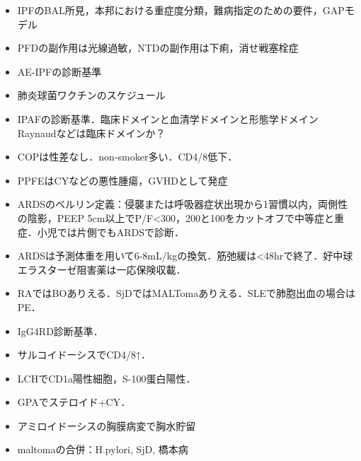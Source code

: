\begin{itemize}
\item IPFのBAL所見，本邦における重症度分類，難病指定のための要件，GAPモデル
\item PFDの副作用は光線過敏，NTDの副作用は下痢，消せ戦塞栓症

\item AE-IPFの診断基準
\item 肺炎球菌ワクチンのスケジュール

\item IPAFの診断基準．臨床ドメインと血清学ドメインと形態学ドメイン Raynaudなどは臨床ドメインか？
\item COPは性差なし．non-smoker多い．CD4/8低下．
\item PPFEはCYなどの悪性腫瘍，GVHDとして発症

\item ARDSのベルリン定義：侵襲または呼吸器症状出現から1習慣以内，両側性の陰影，PEEP 5cm以上でP/F<300，200と100をカットオフで中等症と重症．小児では片側でもARDSで診断．
\item ARDSは予測体重を用いて6-8mL/kgの換気．筋弛緩は<48hrで終了．好中球エラスターゼ阻害薬は一応保険収載．


\item RAではBOありえる．SjDではMALTomaありえる．SLEで肺胞出血の場合はPE．
\item IgG4RD診断基準．
\item サルコイドーシスでCD4/8↑．
\item LCHでCD1a陽性細胞，S-100蛋白陽性．
\item GPAでステロイド+CY．
\item アミロイドーシスの胸膜病変で胸水貯留
\item maltomaの合併：H.pylori, SjD, 橋本病

\end{itemize}
